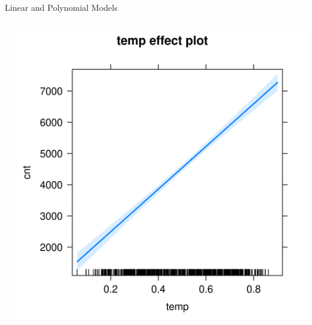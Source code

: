 \documentclass[11pt,compress,t,notes=noshow, aspectratio=169, xcolor=table]{beamer}
\begin{document}
\begin{frame}{Linear and Polynomial Models}

\begin{columns}[T]
\begin{column}{0.55\textwidth}
\tiny

\end{column}
\begin{column}{0.45\textwidth}  %
  \includegraphics[width = \textwidth]{figure/lm_effect_plot.png}
\end{column}
\end{columns}
\end{frame}
\end{document}
